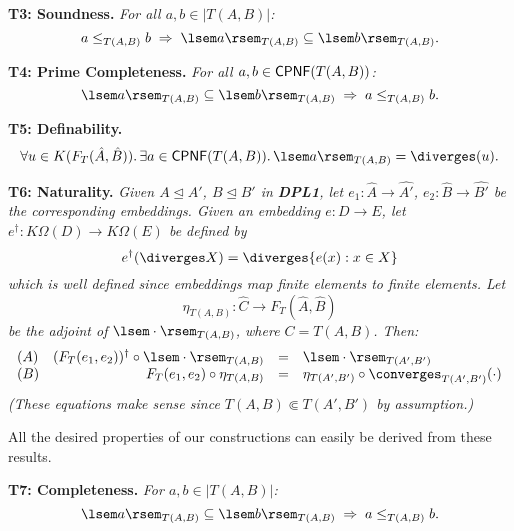 {\bf T3: Soundness.} {\it For all $a, b \in |T(A,B)|$:}
\[ a \leq_{T(A,B)} b \; \Rightarrow \; \lsem a \rsem_{T(A,B)} \subseteq \lsem b \rsem_{T(A,B)}. \]

{\bf T4: Prime Completeness.} {\it For all $a, b \in {\sf CPNF}(T(A,B))$:}
\[ \lsem a \rsem_{T(A,B)} \subseteq \lsem b \rsem_{T(A,B)} \; \Rightarrow \; a \leq_{T(A,B)} b. \]

{\bf T5: Definability.} 
\[ \forall u \in K(F_{T}(\hat{A},\hat{B})). \, \exists a \in {\sf CPNF}(T(A,B)). \, \lsem a \rsem_{T(A,B)} = \diverges (u). \]

{\bf T6: Naturality.} {\it Given $A \trianglelefteq A'$, $B \trianglelefteq B'$ in {\bf DPL1}, let $e_{1} : \hat{A} \rightarrow \hat{A'}$, $e_{2} : \hat{B} \rightarrow \hat{B'}$ be the corresponding embeddings. Given an embedding $e : D \rightarrow E$, let $e^{\dag} : K\Omega (D) \rightarrow K\Omega (E)$ be defined by
\[ e^{\dag}(\diverges X) = \diverges \{ e(x) : x \in X\} \]
which is well defined since embeddings map finite elements to finite elements. 
Let 
\[ \eta_{T(A,B)} : \hat{C} \rightarrow F_{T}(\hat{A},\hat{B}) \]
be the adjoint of $\lsem \cdot \rsem_{T(A, B)}$, where $C = T(A, B)$. Then:
\[ \begin{array}{lrcl}
(A) & (F_{T}(e_{1}, e_{2}))^{\dag} \circ \lsem \cdot \rsem_{T(A, B)} & = & 
\lsem \cdot \rsem_{T(A' , B' )} \\
(B) & F_{T}(e_{1}, e_{2}) \circ \eta_{T(A, B)} & = & \eta_{T(A' , B' )} 
\circ {\converges}_{T(A' , B' )} (\cdot )
\end{array} \]
(These equations make sense since $T(A, B) \Subset T(A' , B' )$ by assumption.)}

All the desired properties of our constructions can easily be derived from these results.

{\bf T7: Completeness.} {\it For $a, b \in |T(A,B)|$:}
\[ \lsem a \rsem_{T(A,B)} \subseteq \lsem b \rsem_{T(A,B)} \; \Rightarrow \; a \leq_{T(A,B)} b. \]

